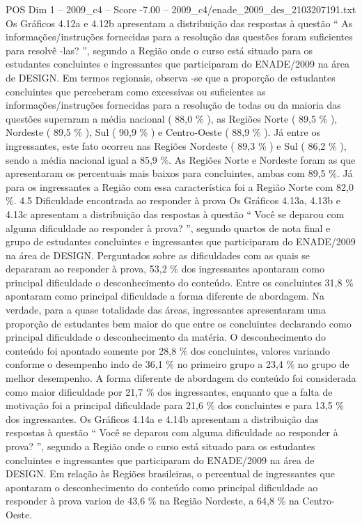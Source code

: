 \begin{textsample}{POS Dim 1 – 2009\_c4 – Score -7.00 – 2009\_c4/enade\_2009\_des\_2103207191.txt}
Os Gráficos 4.12a e 4.12b apresentam a distribuição das respostas à questão “ As informações/instruções fornecidas para a resolução das questões foram suficientes para resolvê -las? ”, segundo a Região onde o curso está situado para os estudantes concluintes e ingressantes que participaram do ENADE/2009 na área de DESIGN.
Em termos regionais, observa -se que a proporção de estudantes concluintes que perceberam como excessivas ou suficientes as informações/instruções fornecidas para a resolução de todas ou da maioria das questões superaram a média nacional ( 88,0 \% ), as Regiões Norte ( 89,5 \% ), Nordeste ( 89,5 \% ), Sul ( 90,9 \% ) e Centro-Oeste ( 88,9 \% ).
Já entre os ingressantes, este fato ocorreu nas Regiões Nordeste ( 89,3 \% ) e Sul ( 86,2 \% ), sendo a média nacional igual a 85,9 \%.
As Regiões Norte e Nordeste foram as que apresentaram os percentuais mais baixos para concluintes, ambas com 89,5 \%.
Já para os ingressantes a Região com essa característica foi a Região Norte com 82,0 \%. 4.5 Dificuldade encontrada ao responder à prova Os Gráficos 4.13a, 4.13b e 4.13c apresentam a distribuição das respostas à questão “ Você se deparou com alguma dificuldade ao responder à prova? ”, segundo quartos de nota final e grupo de estudantes concluintes e ingressantes que participaram do ENADE/2009 na área de DESIGN.
Perguntados sobre as dificuldades com as quais se depararam ao responder à prova, 53,2 \% dos ingressantes apontaram como principal dificuldade o desconhecimento do conteúdo.
Entre os concluintes 31,8 \% apontaram como principal dificuldade a forma diferente de abordagem.
Na verdade, para a quase totalidade das áreas, ingressantes apresentaram uma proporção de estudantes bem maior do que entre os concluintes declarando como principal dificuldade o desconhecimento da matéria.
O desconhecimento do conteúdo foi apontado somente por 28,8 \% dos concluintes, valores variando conforme o desempenho indo de 36,1 \% no primeiro grupo a 23,4 \% no grupo de melhor desempenho.
A forma diferente de abordagem do conteúdo foi considerada como maior dificuldade por 21,7 \% dos ingressantes, enquanto que a falta de motivação foi a principal dificuldade para 21,6 \% dos concluintes e para 13,5 \% dos ingressantes.
Os Gráficos 4.14a e 4.14b apresentam a distribuição das respostas à questão “ Você se deparou com alguma dificuldade ao responder à prova? ”, segundo a Região onde o curso está situado para os estudantes concluintes e ingressantes que participaram do ENADE/2009 na área de DESIGN.
Em relação às Regiões brasileiras, o percentual de ingressantes que apontaram o desconhecimento do conteúdo como principal dificuldade ao responder à prova variou de 43,6 \% na Região Nordeste, a 64,8 \% na Centro-Oeste.

\end{textsample}
